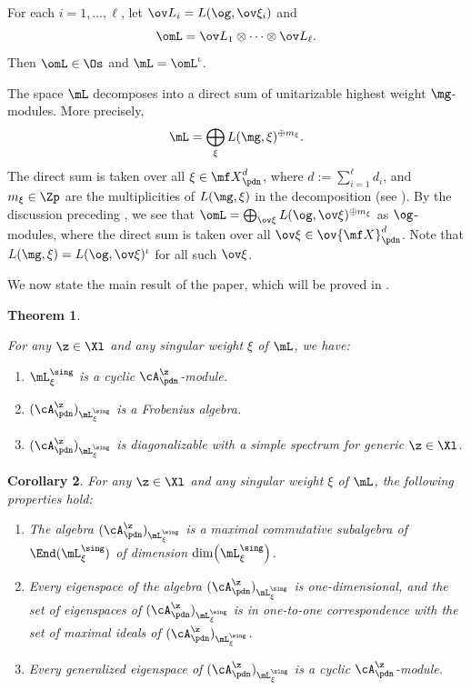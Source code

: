 \documentclass[11pt, reqno]{amsart}
\newtheorem{thm}{Theorem}[section]
\newtheorem{cor}[thm]{Corollary}
\theoremstyle{definition}
\theoremstyle{remark}
\numberwithin{equation}{section}
\begin{document}
 For each $i=1, \ldots, \ell$, let $\ov L_i=L(\og, \ov\xi_i)$ and
 $$
\omL =\ov L_1 \otimes \cdots \otimes  \ov L_\ell.
$$
Then $\omL\in \Os$ and $\mL=\omL^\iota$.


The space $\mL$ decomposes into a direct sum of unitarizable highest weight $\mg$-modules.
More precisely,
$$
\mL= \bigoplus_{\xi} L(\mg, \xi)^{\oplus m_\xi}.
$$
The direct sum is taken over all $\xi  \in {\mf X}^{d}_\pdn$, where $d:=\sum_{i=1}^\ell d_i$, and $m_\xi \in \Zp$ are the multiplicities of $L(\mg, \xi)$ in the decomposition (see \cite[Section 6]{CLZ}).
By the discussion preceding , we see that $\omL= \bigoplus_{\ov\xi}L(\og, \ov\xi)^{\oplus m_\xi}$ as $\og$-modules, where the direct sum is taken over all $\ov\xi  \in \ov {\mf X}^{d}_\pdn$.
Note that $L(\mg, \xi)=L(\og, \ov\xi)^\iota$ for all such $\ov\xi$.

We now state the main result of the paper, which will be proved in .

\begin{thm}\label{Main}

For any $\z \in \Xl$ and any singular weight $\xi$ of $\mL$, we have:

\begin{enumerate}[\normalfont(i)]
\item $\mL_\xi^{\sing}$ is a cyclic $\cA_\pdn^\z$-module.

\item $(\cA_\pdn^\z)_{\mL_\xi^{\sing}}$ is a Frobenius algebra.

\item $(\cA_\pdn^\z)_{\mL_\xi^{\sing}}$ is diagonalizable with a simple spectrum for generic $\z \in \Xl$.

\end{enumerate}

\end{thm}


\begin{cor} \label{max}
For any $\z \in \Xl$ and any singular weight $\xi$ of $\mL$, the following properties hold:

\begin{enumerate} [\normalfont(i)]

\item The algebra $(\cA_\pdn^\z)_{\mL^\sing_{\xi}}$ is a maximal commutative subalgebra of $\End(\mL^\sing_\xi)$ of dimension $\dim \! \left({\mL^\sing_\xi} \right)$.

\item Every eigenspace of the algebra $(\cA_\pdn^\z)_{\mL^\sing_{\xi}}$ is one-dimensional, and the set of eigenspaces of $(\cA_\pdn^\z)_{\mL^\sing_{\xi}}$ is in one-to-one correspondence with the set of maximal ideals of $(\cA_\pdn^\z)_{\mL^\sing_{\xi}}$.

\item Every generalized eigenspace of $(\cA_\pdn^\z)_{\mL^\sing_{\xi}}$ is a cyclic $\cA_\pdn^\z$-module.

\end{enumerate}
\end{cor}
\end{document}
